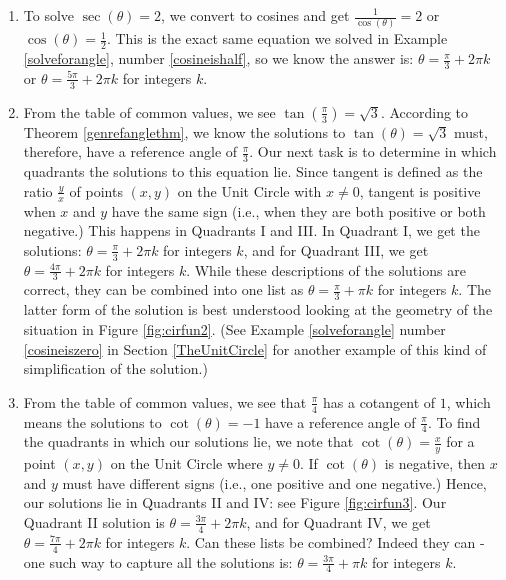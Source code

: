 {
\begin{enumerate}

\item  To solve $\sec(\theta) = 2$, we convert to cosines and get $\frac{1}{\cos(\theta)} = 2$ or $\cos(\theta) = \frac{1}{2}$.  This is the exact same equation we solved in Example \ref{solveforangle}, number \ref{cosineishalf}, so we know the answer is:  $\theta = \frac{\pi}{3} + 2\pi k$ or $\theta = \frac{5\pi}{3} + 2\pi k$ for integers $k$.

\item From the table of common values, we see  $\tan\left(\frac{\pi}{3}\right) = \sqrt{3}$.  According to Theorem \ref{genrefanglethm}, we  know  the solutions to $\tan(\theta) = \sqrt{3}$ must, therefore, have a reference angle of $\frac{\pi}{3}$. Our next task is to determine in which quadrants the solutions to this equation lie. Since tangent is defined as the ratio $\frac{y}{x}$ of points $(x,y)$ on the Unit Circle with $x \neq 0$, tangent is positive when $x$ and $y$ have the same sign (i.e., when they are both positive or both negative.)  This happens in Quadrants I and III.  In Quadrant I, we get the solutions: $\theta = \frac{\pi}{3} + 2\pi k$ for integers $k$, and for Quadrant III, we get $\theta = \frac{4\pi}{3} + 2\pi k$ for integers $k$.  While these descriptions of the solutions are correct, they can be combined into one list as $\theta = \frac{\pi}{3} + \pi k$ for integers $k$. The latter form of the solution is best understood looking at the geometry of the situation in Figure \ref{fig:cirfun2}. (See Example \ref{solveforangle} number \ref{cosineiszero} in Section \ref{TheUnitCircle} for another example of this kind of simplification of the solution.)
 
  

\item  From the table of common values, we see that $\frac{\pi}{4}$ has a cotangent of $1$, which means the solutions to $\cot(\theta) = -1$ have a reference angle of $\frac{\pi}{4}$. To find the quadrants in which our solutions lie, we note that $\cot(\theta) = \frac{x}{y}$ for a point $(x,y)$ on the Unit Circle where $y \neq 0$. If $\cot(\theta)$ is negative, then $x$ and $y$ must have different signs (i.e., one positive and one negative.)  Hence, our solutions lie in Quadrants II and IV: see Figure \ref{fig:cirfun3}.  Our Quadrant II solution is $\theta = \frac{3\pi}{4} + 2\pi k$, and for Quadrant IV, we get $\theta = \frac{7\pi}{4} + 2\pi k$ for integers $k$.  Can these lists be combined?  Indeed they can - one such way to capture all the solutions is:  $\theta = \frac{3\pi}{4} + \pi k$ for integers $k$.


\end{enumerate}}
